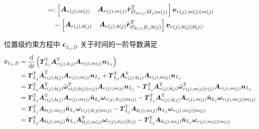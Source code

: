 \begin{align}
  &=: \begin{bmatrix} \boldsymbol{A}_{r(j),m(j)} & \boldsymbol{A}_{r(j),m(j)} \tilde{\boldsymbol{r}}_{O_{m(j)} M_j \mid m(j)}^{\mathrm{T}} \end{bmatrix} \boldsymbol{v}_{r(j),m(j) \mid m(j)} \notag \\
  &\quad - \begin{bmatrix} \boldsymbol{A}_{r(j),b(j)} & \boldsymbol{A}_{r(j),b(j)} \tilde{\boldsymbol{r}}_{O_{b(j)} B_j \mid b(j)}^{\mathrm{T}} \end{bmatrix} \boldsymbol{v}_{r(j),b(j) \mid b(j)}. \label{eq:10.56}
\end{align}

位置级约束方程中 $\boldsymbol{c}_{L_j,D}$ 关于时间的一阶导数满足
\begin{align}
  \dot{\boldsymbol{c}}_{L_j,D} &= \frac{\mathrm{d}}{\mathrm{d}t}\left( \boldsymbol{T}_{L_j}^{\mathrm{T}} \boldsymbol{A}_{r(j),b(j)}^{\mathrm{T}} \boldsymbol{A}_{r(j),m(j)} \boldsymbol{n}_{L_j} \right) \label{eq:10.57} \\
  &= \boldsymbol{T}_{L_j}^{\mathrm{T}} \dot{\boldsymbol{A}}_{r(j),b(j)}^{\mathrm{T}} \boldsymbol{A}_{r(j),m(j)} \boldsymbol{n}_{L_j} + \boldsymbol{T}_{L_j}^{\mathrm{T}} \boldsymbol{A}_{r(j),b(j)}^{\mathrm{T}} \dot{\boldsymbol{A}}_{r(j),m(j)} \boldsymbol{n}_{L_j} \notag \\
  &= \boldsymbol{T}_{L_j}^{\mathrm{T}} \boldsymbol{A}_{r(j),b(j)}^{\mathrm{T}} \tilde{\boldsymbol{\omega}}_{r(j),b(j) \mid r(j)}^{\mathrm{T}} \boldsymbol{A}_{r(j),m(j)} \boldsymbol{n}_{L_j} - \boldsymbol{T}_{L_j}^{\mathrm{T}} \boldsymbol{A}_{r(j),b(j)}^{\mathrm{T}} \tilde{\boldsymbol{\omega}}_{r(j),m(j) \mid r(j)}^{\mathrm{T}} \boldsymbol{A}_{r(j),m(j)} \boldsymbol{n}_{L_j} \notag \\
  &= \boldsymbol{T}_{L_j}^{\mathrm{T}} \boldsymbol{A}_{r(j),b(j)}^{\mathrm{T}} \boldsymbol{A}_{r(j),m(j)} \tilde{\boldsymbol{n}}_{L_j} \boldsymbol{\omega}_{r(j),b(j) \mid m(j)} - \boldsymbol{T}_{L_j}^{\mathrm{T}} \boldsymbol{A}_{r(j),b(j)}^{\mathrm{T}} \boldsymbol{A}_{r(j),m(j)} \tilde{\boldsymbol{n}}_{L_j} \boldsymbol{\omega}_{r(j),m(j) \mid m(j)} \notag \\
  &= \boldsymbol{T}_{L_j}^{\mathrm{T}} \boldsymbol{A}_{b(j),m(j)} \tilde{\boldsymbol{n}}_{L_j} \boldsymbol{\omega}_{r(j),b(j) \mid m(j)} - \boldsymbol{T}_{L_j}^{\mathrm{T}} \boldsymbol{A}_{b(j),m(j)} \tilde{\boldsymbol{n}}_{L_j} \boldsymbol{\omega}_{r(j),m(j) \mid m(j)} \notag \\
  &= \boldsymbol{T}_{L_j}^{\mathrm{T}} \boldsymbol{A}_{b(j),m(j)} \tilde{\boldsymbol{n}}_{L_j} \boldsymbol{A}_{b(j),m(j)}^{\mathrm{T}} \boldsymbol{\omega}_{r(j),b(j) \mid b(j)} - \boldsymbol{T}_{L_j}^{\mathrm{T}} \boldsymbol{A}_{b(j),m(j)} \tilde{\boldsymbol{n}}_{L_j} \boldsymbol{\omega}_{r(j),m(j) \mid m(j)} \notag \\

\end{align}
